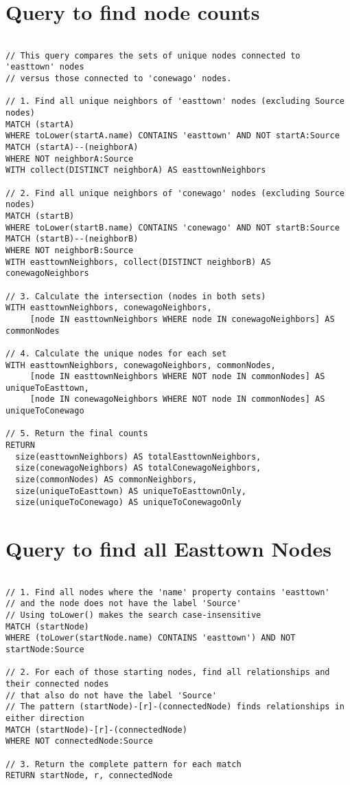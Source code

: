 \section{Query to find node counts}
\begin{verbatim}

// This query compares the sets of unique nodes connected to 'easttown' nodes
// versus those connected to 'conewago' nodes.

// 1. Find all unique neighbors of 'easttown' nodes (excluding Source nodes)
MATCH (startA)
WHERE toLower(startA.name) CONTAINS 'easttown' AND NOT startA:Source
MATCH (startA)--(neighborA)
WHERE NOT neighborA:Source
WITH collect(DISTINCT neighborA) AS easttownNeighbors

// 2. Find all unique neighbors of 'conewago' nodes (excluding Source nodes)
MATCH (startB)
WHERE toLower(startB.name) CONTAINS 'conewago' AND NOT startB:Source
MATCH (startB)--(neighborB)
WHERE NOT neighborB:Source
WITH easttownNeighbors, collect(DISTINCT neighborB) AS conewagoNeighbors

// 3. Calculate the intersection (nodes in both sets)
WITH easttownNeighbors, conewagoNeighbors,
     [node IN easttownNeighbors WHERE node IN conewagoNeighbors] AS commonNodes

// 4. Calculate the unique nodes for each set
WITH easttownNeighbors, conewagoNeighbors, commonNodes,
     [node IN easttownNeighbors WHERE NOT node IN commonNodes] AS uniqueToEasttown,
     [node IN conewagoNeighbors WHERE NOT node IN commonNodes] AS uniqueToConewago

// 5. Return the final counts
RETURN
  size(easttownNeighbors) AS totalEasttownNeighbors,
  size(conewagoNeighbors) AS totalConewagoNeighbors,
  size(commonNodes) AS commonNeighbors,
  size(uniqueToEasttown) AS uniqueToEasttownOnly,
  size(uniqueToConewago) AS uniqueToConewagoOnly
\end{verbatim}

\section{Query to find all Easttown Nodes}
\begin{verbatim}

// 1. Find all nodes where the 'name' property contains 'easttown'
// and the node does not have the label 'Source'
// Using toLower() makes the search case-insensitive
MATCH (startNode)
WHERE (toLower(startNode.name) CONTAINS 'easttown') AND NOT startNode:Source

// 2. For each of those starting nodes, find all relationships and their connected nodes
// that also do not have the label 'Source'
// The pattern (startNode)-[r]-(connectedNode) finds relationships in either direction
MATCH (startNode)-[r]-(connectedNode)
WHERE NOT connectedNode:Source

// 3. Return the complete pattern for each match
RETURN startNode, r, connectedNode
\end{verbatim}

